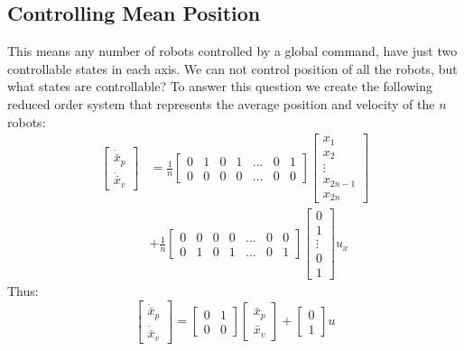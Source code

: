\subsection{Controlling Mean Position}\label{sec:controlMeanPosition}
This means any number of robots controlled by a global command, have just two controllable states in each axis. We can not control position of all the robots, but what states are controllable? To answer this question we create the following reduced order system that represents the average position and velocity of the $n$ robots:
\begin{align}
\begin{bmatrix}\nonumber
\dot{\bar{x}}_p \\
\dot{\bar{x}}_v
\end{bmatrix} &= \frac{1}{n} \begin{bmatrix}
0& 1& 0& 1& ... &0& 1 \\
0& 0& 0& 0& ... &0& 0
\end{bmatrix}
\begin{bmatrix}
x_1\\
x_2\\
\vdots\\
x_{2n-1}\\
x_{2n}
\end{bmatrix} \\
&+ \frac{1}{n}\begin{bmatrix}
0& 0& 0& 0& ... &0& 0 \\
0& 1& 0& 1& ... &0& 1
\end{bmatrix}\begin{bmatrix} 
0\\
1\\
\vdots\\
0\\
1
\end{bmatrix} u_x
\end{align}
Thus:
\begin{equation}
\begin{bmatrix}
\dot{\bar{x}}_p \\
\dot{\bar{x}}_v
\end{bmatrix} = \begin{bmatrix}
0& 1 \\
0& 0
\end{bmatrix}
\begin{bmatrix}
\bar{x}_p\\
\bar{x}_v
\end{bmatrix} + \begin{bmatrix} 
0\\
1
\end{bmatrix} u
\end{equation}

